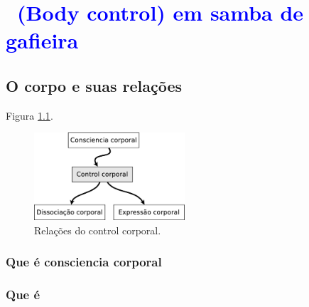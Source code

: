 

\chapter{\textcolor{blue}{ \Bodycontrol~(Body control) em samba de gafieira }}

\section{ O corpo e suas relações}


Figura \ref{fig:bodycontroltotal}.

\begin{figure}[!h]
  \centering
    \includegraphics[width=0.5\textwidth]{chapters/cap-body-control/total.eps}
\caption{Relações do control corporal.}
\label{fig:bodycontroltotal}
\end{figure}


\subsection{Que é consciencia corporal}
\cite[pp. 11]{balcells2002expresion}
\cite{bueno2016psicomotricidade}
\cite[pp. 232]{gaiarsameio}
\cite[pp. 61]{aranha2002desenvolvimento}
\cite[pp. 75]{vallejo2001cuerpo}

\subsection{Que é \Bodycontrol}

\cite{bolio2006fantasia}
\cite[pp. 215]{moreno2008expresion}

